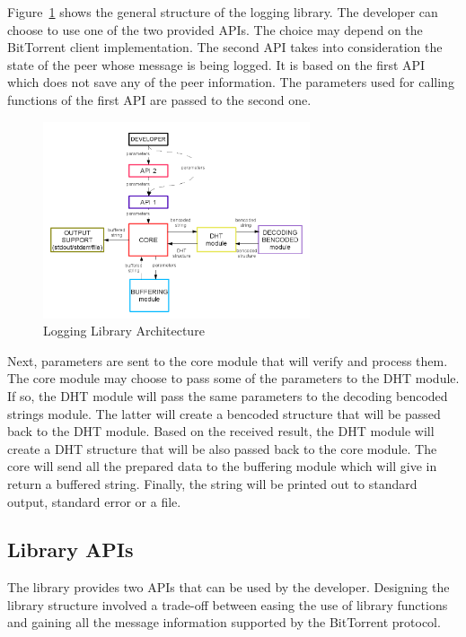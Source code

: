 Figure~\ref{fig:proto-measure:log-library-architecture} shows the general
structure of the logging library. The developer can choose to use one of the
two provided APIs. The choice may depend on the BitTorrent client implementation.
The second API takes into consideration the state of the peer whose message is
being logged. It is based on the first API which does not save any of the
peer information. The parameters used for calling functions of the first API
are passed to the second one.

\begin{figure}[h]
  \begin{center}
    \includegraphics[width=0.7\textwidth]{src/img/proto-measure/log-library-architecture}
  \end{center}
  \caption{Logging Library Architecture}
  \label{fig:proto-measure:log-library-architecture}
\end{figure}

Next, parameters are sent to the core module that will verify and process
them. The core module may choose to pass some of the parameters to the DHT
module. If so, the DHT module will pass the same parameters to the decoding
bencoded strings module. The latter will create a bencoded structure that will
be passed back to the DHT module. Based on the received result, the DHT module
will create a DHT structure that will be also passed back to the core module.
The core will send all the prepared data to the buffering module which will
give in return a buffered string. Finally, the string will be printed out to
standard output, standard error or a file.

\subsection{Library APIs}

The library provides two APIs that can be used by the developer. Designing the
library structure involved a trade-off between easing the use of library
functions and gaining all the message information supported by the BitTorrent
protocol.

